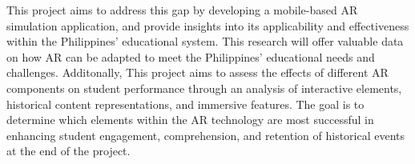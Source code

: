 This project aims to address this gap by developing a mobile-based AR simulation application, and provide insights into its applicability and effectiveness within the Philippines' educational system. This research will offer valuable data on how AR can be adapted to meet the Philippines' educational needs and challenges. Additonally, This project aims to assess the effects of different AR components on student performance through an analysis of interactive elements, historical content representations, and immersive features. The goal is to determine which elements within the AR technology are most successful in enhancing student engagement,  comprehension, and retention of historical events at the end of the project.

